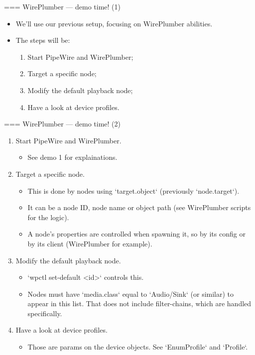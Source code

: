 === {WirePlumber — demo time! (1)}
  \begin{itemize}

  \item We'll use our previous setup, focusing on WirePlumber abilities.

  \item The steps will be:

    \begin{enumerate}
    \item Start PipeWire and WirePlumber;
    \item Target a specific node;
    \item Modify the default playback node;
    \item Have a look at device profiles.
    \end{enumerate}

  \end{itemize}




=== {WirePlumber — demo time! (2)}
  \begin{enumerate}

  \item Start PipeWire and WirePlumber.

    \begin{itemize}
    \item See demo 1 for explainations.
    \end{itemize}

  \item Target a specific node.

    \begin{itemize}
    \item This is done by nodes using `target.object` (previously
      `node.target`).
    \item It can be a node ID, node name or object path (see
      WirePlumber scripts for the logic).
    \item A node's properties are controlled when spawning it, so by
      its config or by its client (WirePlumber for example).
    \end{itemize}

  \item Modify the default playback node.

    \begin{itemize}
    \item `wpctl set-default <id>` controls this.
    \item Nodes must have `media.class` equal to `Audio/Sink`
      (or similar) to appear in this list. That does not include filter-chains,
      which are handled specifically.
    \end{itemize}

  \item Have a look at device profiles.

    \begin{itemize}
    \item Those are params on the device objects. See `EnumProfile`
      and `Profile`.
    \end{itemize}

  \end{enumerate}




